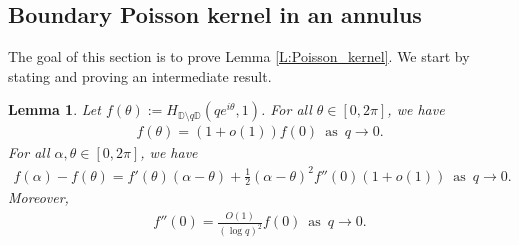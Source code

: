 \documentclass[11pt]{article}
\newtheorem{lemma}[theorem]{Lemma}
\theoremstyle{remark}
\numberwithin{equation}{section}
\begin{document}
\subsection{Boundary Poisson kernel in an annulus}\label{S:Poisson}

The goal of this section is to prove Lemma \ref{L:Poisson_kernel}. We start by stating and proving an intermediate result.


\begin{lemma}\label{lem:f_develop}
Let  $f(\theta):=H_{{\mathbb{D}}\setminus q{\mathbb{D}}} (q e^{i\theta}, 1)$.
For all $\theta\in[0,2\pi]$, we have
\begin{align}\label{eq:lem1}
f(\theta) = (1+o(1)) f(0)  \, \text{ as } \, q\to 0.
\end{align}
For all $\alpha, \theta \in[0, 2\pi]$, we have
\begin{align}\label{eq:lem2}
f (\alpha) - f(\theta) = f'(\theta) (\alpha -\theta) + \frac12 (\alpha -\theta)^2 f''(0)  \left(1+ o(1)\right)  \, \text{ as } \, q\to 0.
\end{align}
Moreover, 
\begin{align}\label{eq:lem3}
f''(0) =\frac{O(1)}{(\log q)^2} f(0)  \, \text{ as } \, q\to 0.
\end{align}
\end{lemma}
\end{document}
